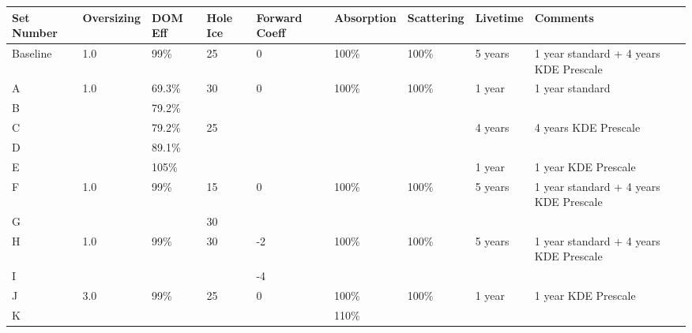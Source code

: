 \begin{landscape}
\begin{table}[]
\centering
\begin{tabular}{@{}lllllllll@{}}
\toprule
Set Number & Oversizing & DOM Eff & Hole Ice & Forward Coeff & Absorption & Scattering & Livetime & Comments                               \\ \midrule
Baseline   & 1.0        & 99\%    & 25       & 0             & 100\%      & 100\%      & 5 years  & 1 year standard + 4 years KDE Prescale\\ \midrule
A          & 1.0        & 69.3\%  & 30       & 0             & 100\%      & 100\%      & 1 year   & 1 year standard                        \\
B          &            & 79.2\%  &          &               &            &            &          &                                        \\
C          &            & 79.2\%  & 25       &               &            &            & 4 years  & 4 years KDE Prescale   \\
D          &            & 89.1\%  &           &               &            &            &          &                                        \\ 
E          &            & 105\%  &           &               &            &            & 1 year & 1 year KDE Prescale           \\ \midrule
F          & 1.0        & 99\%    & 15       & 0             & 100\%      & 100\%      & 5 years  & 1 year standard + 4 years KDE Prescale \\
G          &            &         & 30       &               &            &            &          &                                        \\ \midrule
H          & 1.0        & 99\%    & 30       & -2            & 100\%      & 100\%      & 5 years  & 1 year standard + 4 years KDE Prescale \\
I          &            &         &          & -4            &            &            &          &                                        \\ \midrule
J          & 3.0        & 99\%    & 25       & 0             & 100\%      & 100\%      & 1 year   & 1 year KDE Prescale\\
K          &            &         &          &               & 110\%      &                 &          &                                        \\

\end{tabular}
\end{table}
\end{landscape}
